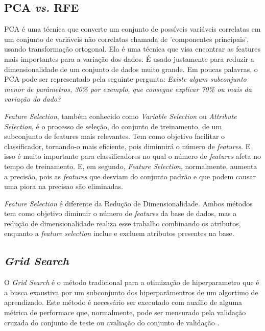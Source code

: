 \subsection{PCA \textit{vs.} RFE}
PCA é uma técnica que converte um conjunto de possíveis variáveis correlatas em um conjunto de variáveis não correlatas chamada de 'componentes principais', usando transformação ortogonal. Ela é uma técnica que visa encontrar as features mais importantes para a variação dos dados. É usado justamente para reduzir a dimensionalidade de um conjunto de dados muito grande. Em poucas palavras, o PCA pode ser representado pela seguinte pergunta: \textit{Existe algum subconjunto menor de parâmetros, 30\% por exemplo, que consegue explicar 70\% ou mais da variação do dado?}

\textit{Feature Selection}, também conhecido como \textit{Variable Selection} ou \textit{Attribute Selection}, é o processo de seleção, do conjunto de treinamento, de um subconjunto de features mais relevantes. Tem como objetivo facilitar o classificador, tornando-o mais eficiente, pois diminuirá o número de \textit{features}. E isso é muito importante para classificadores no qual o número de \textit{features} afeta no tempo de treinamento. E, em segundo, \textit{Feature Selection}, normalmente, aumenta a precisão, pois as \textit{features} que desviam do conjunto padrão e que podem causar uma piora na precisao são eliminadas.

\textit{Feature Selection} é diferente da Redução de Dimensionalidade. Ambos métodos tem como objetivo diminuir o número de \textit{features} da base de dados, mas a redução de dimensionalidade realiza esse trabalho combinando os atributos, enquanto a \textit{feature selection} inclue e excluem atributos presentes na base.

\subsection{\textit{Grid Search}}
O \textit{Grid Search} é o método tradicional para a otimização de hiperparametro que é a busca exaustiva por um subconjunto dos hiperparâmentros de um algortimo de aprendizado. Este método é necessário ser executado com auxílio de alguma métrica de performace que, normalmente, pode ser mensurado pela validação cruzada do conjunto de teste ou avaliação do conjunto de validação \cite{Hsu10}.